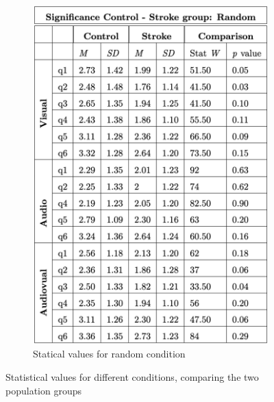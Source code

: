 \begin{figure}[htbp]
\begin{subfigure}[htbp]{0.45\textwidth}
        \includegraphics[width=\textwidth]{significance_tables/significance_random_pop.png}
        \caption{Statical values for random condition}
        \label{fig: significance_pop_random} 
    \end{subfigure} 
    \caption{Statistical values for different conditions, comparing the two population groups}
    \label{fig: significance pop}
\end{figure}

